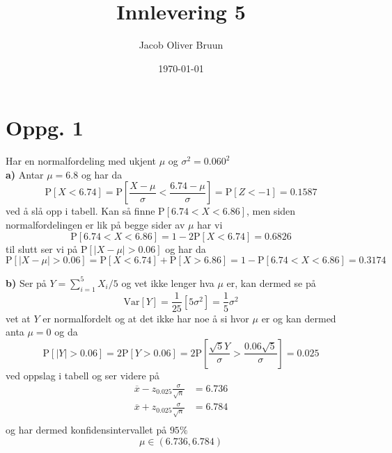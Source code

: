 \documentclass{report}
\title{Innlevering 5}
\author{Jacob Oliver Bruun}
\date{\today}
\newcommand{\nbrack}[1]{\left( #1 \right)}
\newcommand{\bbrack}[1]{\left[ #1 \right]}
\newcommand{\Var}[1]{\text{Var} \bbrack{ #1 }}
\newcommand{\Prob}[1]{\text{P} \bbrack{ #1 }}
\begin{document}
\section*{Oppg. 1}
Har en normalfordeling med ukjent $\mu$ og $\sigma^{2} = 0.060^{2}$ \\

\textbf{a)}
Antar $\mu = 6.8$ og har da
\begin{equation}
  \label{eq:1}
  \Prob{ X < 6.74 } = \Prob{ \frac{X-\mu}{\sigma} < \frac{6.74 - \mu}{\sigma}} = \Prob{ Z < -1 } = 0.1587
\end{equation}
ved å slå opp i tabell. Kan så finne $\Prob{6.74 < X < 6.86}$, men siden normalfordelingen er lik på begge sider av $\mu$ har vi
\begin{equation}
  \label{eq:2}
  \Prob{6.74 < X < 6.86} = 1 - 2\Prob{ X < 6.74 } = 0.6826
\end{equation}
til slutt ser vi på $\Prob{ |X - \mu| > 0.06 }$ og har da
\begin{equation}
  \label{eq:3}
  \Prob{ |X - \mu| > 0.06 } = \Prob{X < 6.74} + \Prob{X > 6.86} = 1 - \Prob{6.74 < X < 6.86} = 0.3174
\end{equation}

\textbf{b)}
Ser på $Y = \sum_{i=1}^{5} X_{i}/5$ og vet ikke lenger hva $\mu$ er, kan dermed se på
\begin{equation}
  \label{eq:5}
  \Var{Y} = \frac{1}{25} \bbrack{ 5\sigma^{2} } = \frac{1}{5} \sigma^{2}
\end{equation}
vet at $Y$ er normalfordelt og at det ikke har noe å si hvor $\mu$ er og kan dermed anta $\mu = 0$ og da
\begin{equation}
  \label{eq:20}
  \Prob{|Y| > 0.06} = 2\Prob{Y > 0.06} = 2\Prob{\frac{\sqrt{5} Y}{\sigma} > \frac{0.06\sqrt{5}}{\sigma}} = 0.025
\end{equation}
ved oppslag i tabell og ser videre på
\begin{equation}
  \label{eq:18}
  \begin{split}
    \overline{x} - z_{0.025}\frac{\sigma}{\sqrt{n}} &= 6.736 \\
    \overline{x} + z_{0.025}\frac{\sigma}{\sqrt{n}} &= 6.784 \\
  \end{split}
\end{equation}
og har dermed konfidensintervallet på $95\%$
\begin{equation}
  \label{eq:19}
  \mu \in \nbrack{ 6.736, 6.784 }
\end{equation}
\end{document}
